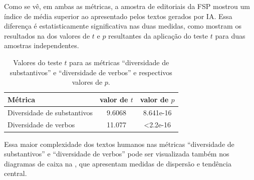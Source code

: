 \documentclass[portuguese]{textolivre}
\begin{document}
Como se vê, em ambas as métricas, a amostra de editoriais da FSP mostrou um índice de média superior ao apresentado pelos textos gerados por IA.
Essa diferença é estatisticamente significativa nas duas medidas, como mostram os resultados na  dos valores de $t$ e $p$ resultantes da aplicação do teste $t$ para duas amostras independentes.

\begin{table}[htpb]
\centering
\begin{threeparttable}
\caption{Valores do teste $t$ para as métricas ``diversidade de substantivos'' e ``diversidade de verbos'' e respectivos valores de $p$.}
\label{tbl-tabela-04}
\begin{tabular}{lcc}
\toprule 
Métrica & valor de $t$ & valor de $p$ \\ 
\midrule
  Diversidade de substantivos & 9.6068 & 8.641e-16 \\
  Diversidade de verbos & 11.077 & <2.2e-16 \\
\bottomrule
\end{tabular}
\end{threeparttable}
\end{table}

Essa maior complexidade dos textos humanos nas métricas ``diversidade de substantivos'' e ``diversidade de verbos'' pode ser visualizada também nos diagramas de caixa na , que apresentam medidas de dispersão e tendência central.
\end{document}
